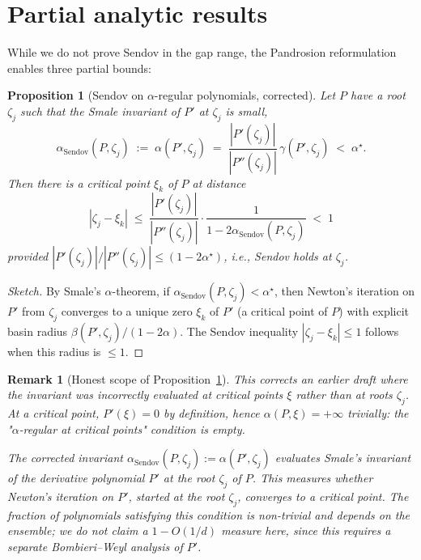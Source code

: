 \documentclass[11pt,a4paper]{article}
\newtheorem{proposition}[theorem]{Proposition}
\newtheorem{remark}[theorem]{Remark}
\begin{document}
\section{Partial analytic results}\label{sec:partial}

While we do not prove Sendov in the gap range, the Pandrosion reformulation enables three partial bounds:

\begin{proposition}[Sendov on $\alpha$-regular polynomials, corrected]\label{prop:alpha-reg}
Let $P$ have a root $\zeta_j$ such that the Smale invariant of $P'$ at $\zeta_j$ is small,
\begin{equation}\label{eq:alpha-sendov}
\alpha_{\mathrm{Sendov}}(P, \zeta_j) \;:=\; \alpha(P', \zeta_j) \;=\; \frac{|P'(\zeta_j)|}{|P''(\zeta_j)|}\, \gamma(P', \zeta_j) \;<\; \alpha^\star.
\end{equation}
Then there is a critical point $\xi_k$ of $P$ at distance
$$
|\zeta_j - \xi_k| \;\le\; \frac{|P'(\zeta_j)|}{|P''(\zeta_j)|} \cdot \frac{1}{1 - 2\alpha_{\mathrm{Sendov}}(P, \zeta_j)} \;<\; 1
$$
provided $|P'(\zeta_j)|/|P''(\zeta_j)| \le (1 - 2\alpha^\star)$, i.e., Sendov holds at $\zeta_j$.
\end{proposition}

\begin{proof}[Sketch]
By Smale's $\alpha$-theorem, if $\alpha_{\mathrm{Sendov}}(P, \zeta_j) < \alpha^\star$, then Newton's iteration on $P'$ from $\zeta_j$ converges to a unique zero $\xi_k$ of $P'$ (a critical point of $P$) with explicit basin radius $\beta(P', \zeta_j)/(1 - 2\alpha)$. The Sendov inequality $|\zeta_j - \xi_k| \le 1$ follows when this radius is $\le 1$.
\end{proof}

\begin{remark}[Honest scope of Proposition~\ref{prop:alpha-reg}]
This corrects an earlier draft where the invariant was incorrectly evaluated at critical points $\xi$ rather than at roots $\zeta_j$. At a critical point, $P'(\xi) = 0$ by definition, hence $\alpha(P, \xi) = +\infty$ trivially: the "$\alpha$-regular at critical points" condition is empty.

The corrected invariant $\alpha_{\mathrm{Sendov}}(P, \zeta_j) := \alpha(P', \zeta_j)$ evaluates Smale's invariant of the \emph{derivative} polynomial $P'$ at the \emph{root} $\zeta_j$ of $P$. This measures whether Newton's iteration on $P'$, started at the root $\zeta_j$, converges to a critical point. The fraction of polynomials satisfying this condition is non-trivial and depends on the ensemble; we do not claim a $1 - O(1/d)$ measure here, since this requires a separate Bombieri--Weyl analysis of $P'$.
\end{remark}
\end{document}
